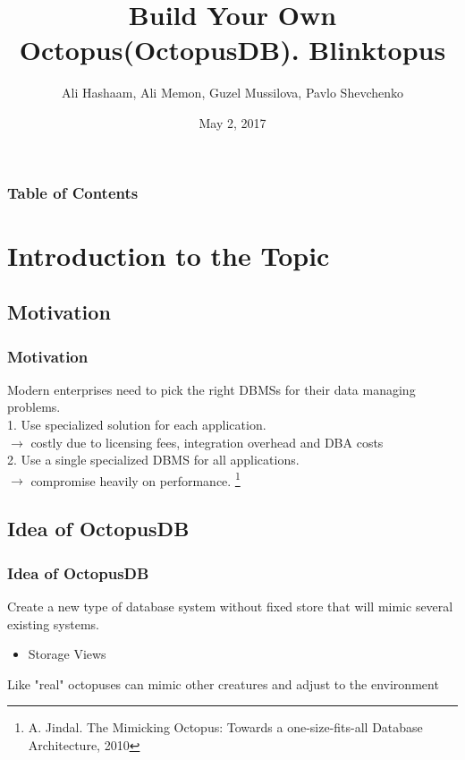 \documentclass{beamer}
\title{Build Your Own Octopus(OctopusDB). Blinktopus}
\author{Ali Hashaam, Ali Memon, Guzel Mussilova, Pavlo Shevchenko}
\date{May 2, 2017}
\institute{Scientific Project: Databases for Multi-Dimensional Data, Genomics and Modern Hardware}
\begin{document}
\begin{frame}[plain]
 \titlepage
\end{frame}

\begin{frame}
\frametitle{Table of Contents}
\tableofcontents
\end{frame}

\section{Introduction to the Topic}

\subsection{Motivation}
\begin{frame}
\frametitle{Motivation}
Modern enterprises need to pick the right DBMSs for their data managing problems.\\ \pause
\hspace{0.2 cm} 1. Use specialized solution for each application. \\ \pause
\hspace{0.5 cm} $\rightarrow$ costly due to licensing fees, integration overhead and DBA costs\\ \pause
\hspace{0.2 cm} 2. Use a single specialized DBMS for all applications. \\ \pause
\hspace{0.5 cm} $\rightarrow$ compromise heavily on performance.
\footnote{A. Jindal. The Mimicking Octopus: Towards a one-size-fits-all Database Architecture, 2010}
\end{frame}

\subsection{Idea of OctopusDB}
\begin{frame}
\frametitle{Idea of OctopusDB}
Create a new type of database system without fixed store that will mimic several existing systems. \\ \pause
\begin{itemize}
\item{Storage Views}
\end{itemize}
Like "real" octopuses can mimic other creatures and adjust to the environment
\end{frame}
\end{document}
